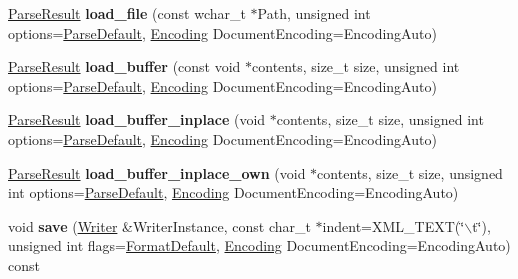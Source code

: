 \begin{DoxyCompactItemize}
\item 
\hypertarget{classphys_1_1xml_1_1Document_a973fa855420c37094588e17ee5f6fc79}{
\hyperlink{structphys_1_1xml_1_1ParseResult}{ParseResult} {\bfseries load\_\-file} (const wchar\_\-t $\ast$Path, unsigned int options=\hyperlink{namespacephys_1_1xml_aa6b8f7f8c2322fd683a235b498834d60}{ParseDefault}, \hyperlink{namespacephys_1_1xml_a420f5de782438f88160321385bea2015}{Encoding} DocumentEncoding=EncodingAuto)}
\label{dd/d44/classphys_1_1xml_1_1Document_a973fa855420c37094588e17ee5f6fc79}

\item 
\hypertarget{classphys_1_1xml_1_1Document_a92ce092d1b7ea617a02ebbcbb7e30437}{
\hyperlink{structphys_1_1xml_1_1ParseResult}{ParseResult} {\bfseries load\_\-buffer} (const void $\ast$contents, size\_\-t size, unsigned int options=\hyperlink{namespacephys_1_1xml_aa6b8f7f8c2322fd683a235b498834d60}{ParseDefault}, \hyperlink{namespacephys_1_1xml_a420f5de782438f88160321385bea2015}{Encoding} DocumentEncoding=EncodingAuto)}
\label{dd/d44/classphys_1_1xml_1_1Document_a92ce092d1b7ea617a02ebbcbb7e30437}

\item 
\hypertarget{classphys_1_1xml_1_1Document_a86aac9113528f2f91a07b408366cc5b9}{
\hyperlink{structphys_1_1xml_1_1ParseResult}{ParseResult} {\bfseries load\_\-buffer\_\-inplace} (void $\ast$contents, size\_\-t size, unsigned int options=\hyperlink{namespacephys_1_1xml_aa6b8f7f8c2322fd683a235b498834d60}{ParseDefault}, \hyperlink{namespacephys_1_1xml_a420f5de782438f88160321385bea2015}{Encoding} DocumentEncoding=EncodingAuto)}
\label{dd/d44/classphys_1_1xml_1_1Document_a86aac9113528f2f91a07b408366cc5b9}

\item 
\hypertarget{classphys_1_1xml_1_1Document_a54ae4f27f7d4aef70f68e1c771fc1720}{
\hyperlink{structphys_1_1xml_1_1ParseResult}{ParseResult} {\bfseries load\_\-buffer\_\-inplace\_\-own} (void $\ast$contents, size\_\-t size, unsigned int options=\hyperlink{namespacephys_1_1xml_aa6b8f7f8c2322fd683a235b498834d60}{ParseDefault}, \hyperlink{namespacephys_1_1xml_a420f5de782438f88160321385bea2015}{Encoding} DocumentEncoding=EncodingAuto)}
\label{dd/d44/classphys_1_1xml_1_1Document_a54ae4f27f7d4aef70f68e1c771fc1720}

\item 
\hypertarget{classphys_1_1xml_1_1Document_a90c83e9875639c0979cc6846353f0bf7}{
void {\bfseries save} (\hyperlink{classphys_1_1xml_1_1Writer}{Writer} \&WriterInstance, const char\_\-t $\ast$indent=XML\_\-TEXT(\char`\"{}$\backslash$t\char`\"{}), unsigned int flags=\hyperlink{namespacephys_1_1xml_a08bf6aab51f79929d9097706a5e64408}{FormatDefault}, \hyperlink{namespacephys_1_1xml_a420f5de782438f88160321385bea2015}{Encoding} DocumentEncoding=EncodingAuto) const }
\label{dd/d44/classphys_1_1xml_1_1Document_a90c83e9875639c0979cc6846353f0bf7}


\end{DoxyCompactItemize}
